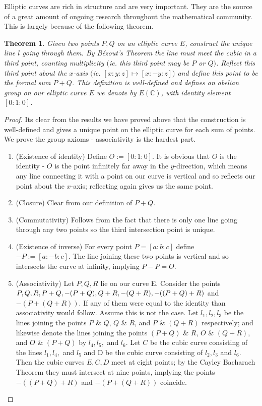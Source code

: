 \documentclass{article}
\newtheorem{theorem}{Theorem}
\theoremstyle{remark}
\begin{document}
\par
Elliptic curves are rich in structure and are very important. They are the source of a great amount of ongoing research throughout the mathematical community. This is largely because of the following theorem.
\begin{theorem}
Given two points $P,Q$ on an elliptic curve $E$, construct the unique line $l$ going through them. By Bézout's Theorem the line must meet the cubic in a third point, counting multiplicity $($ie. this third point may be $P$ or $Q$$)$. Reflect this third point about the $x$-axis $($ie. $[x:y:z]\mapsto [x:-y:z]$$)$ and define this point to be the formal sum $P+Q$. This definition is well-defined and defines an abelian group on our elliptic curve $E$ we denote by $E(\mathbb{C})$, with identity element $[0:1:0]$.
\end{theorem}
\begin{proof}
Its clear from the results we have proved above that the construction is well-defined and gives a unique point on the elliptic curve for each sum of points. We prove the group axioms - associativity is the hardest part.
\begin{enumerate}
\item (Existence of identity) Define $O:=[0:1:0]$. It is obvious that $O$ is the identity - $O$ is the point infinitely far away in the $y$-direction, which means any line connecting it with a point on our curve is vertical and so reflects our point about the $x$-axis; reflecting again gives us the same point.
\item (Closure) Clear from our definition of $P+Q$.
\item (Commutativity) Follows from the fact that there is only one line going through any two points so the third intersection point is unique.
\item (Existence of inverse) For every point $P=[a:b:c]$ define \\$-P:=[a:-b:c]$. The line joining these two points is vertical and so intersects the curve at infinity, implying $P-P=O$.
\item (Associativity) Let $P,Q,R$ lie on our curve E. Consider the points $ P, Q, R, \\ P+Q, -(P+Q), Q+R, -(Q+R), -((P+Q)+R)$ and $-(P+(Q+R))$. If any of them were equal to the identity than associativity would follow. Assume this is not the case. Let $l_1, l_2, l_3$ be the lines joining the points $P$ \& $Q$, $Q$ \& $R$, and $P$ \& $(Q+R)$ respectively; and likewise denote the lines joining the points $(P+Q)$ \& $R$, $O$ \& $(Q+R)$, and $O$ \& $(P+Q)$ by $l_4, l_5,$ and $l_6$. Let $C$ be the cubic curve consisting of the lines $l_1, l_4,$ and $l_5$ and D be the cubic curve consisting of $l_2, l_3$ and $l_6$. Then the cubic curves $E,C,D$ meet at eight points; by the Cayley Bacharach Theorem they must intersect at nine points, implying the points $-((P+Q)+R)$ and $-(P+(Q+R))$ coincide.
\end{enumerate}
\end{proof}
\end{document}

